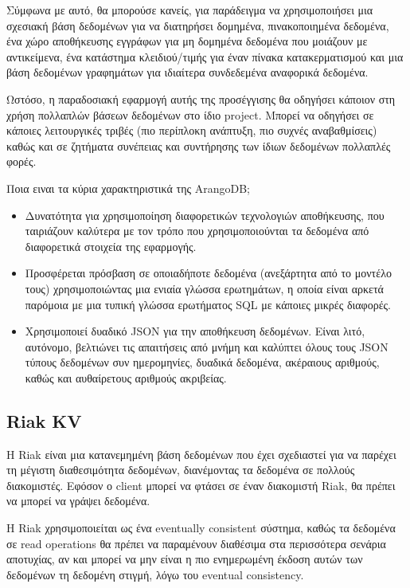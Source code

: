 \documentclass[conference]{IEEEtran}
\begin{document}
Σύμφωνα με αυτό, θα μπορούσε κανείς, για παράδειγμα να χρησιμοποιήσει μια σχεσιακή βάση δεδομένων για να διατηρήσει δομημένα, πινακοποιημένα δεδομένα, ένα χώρο αποθήκευσης εγγράφων για μη δομημένα δεδομένα που μοιάζουν με αντικείμενα, ένα κατάστημα κλειδιού/τιμής για έναν πίνακα κατακερματισμού και μια βάση δεδομένων γραφημάτων για ιδιαίτερα συνδεδεμένα αναφορικά δεδομένα.

Ωστόσο, η παραδοσιακή εφαρμογή αυτής της προσέγγισης θα οδηγήσει κάποιον στη χρήση πολλαπλών βάσεων δεδομένων στο ίδιο project. Μπορεί να οδηγήσει σε κάποιες λειτουργικές τριβές (πιο περίπλοκη ανάπτυξη, πιο συχνές αναβαθμίσεις) καθώς και σε ζητήματα συνέπειας και συντήρησης των ίδιων δεδομένων πολλαπλές φορές.

Ποια ειναι τα κύρια χαρακτηριστικά της ArangoDB;
\begin{itemize}
    \item 
    Δυνατότητα για χρησιμοποίηση διαφορετικών τεχνολογιών αποθήκευσης, που ταιριάζουν καλύτερα με τον τρόπο που χρησιμοποιούνται τα δεδομένα από διαφορετικά στοιχεία της εφαρμογής.
    
    \item 
    Προσφέρεται πρόσβαση σε οποιαδήποτε δεδομένα (ανεξάρτητα από το μοντέλο τους) χρησιμοποιώντας μια ενιαία γλώσσα ερωτημάτων, η οποία είναι αρκετά παρόμοια με μια τυπική γλώσσα ερωτήματος SQL με κάποιες μικρές διαφορές.

    \item 
    Χρησιμοποιεί δυαδικό JSON για την αποθήκευση δεδομένων. Είναι λιτό, αυτόνομο, βελτιώνει τις απαιτήσεις από μνήμη και καλύπτει όλους τους JSON τύπους δεδομένων συν ημερομηνίες, δυαδικά δεδομένα, ακέραιους αριθμούς, καθώς και αυθαίρετους αριθμούς ακριβείας.
\end{itemize}

\subsection{Riak KV}

 Η Riak είναι μια κατανεμημένη βάση δεδομένων που έχει σχεδιαστεί για να παρέχει τη μέγιστη διαθεσιμότητα δεδομένων, διανέμοντας τα δεδομένα σε πολλούς διακομιστές. Εφόσον ο client μπορεί να φτάσει σε έναν διακομιστή Riak, θα πρέπει να μπορεί να γράψει δεδομένα.

H Riak χρησιμοποιείται ως ένα eventually consistent σύστημα, καθώς τα δεδομένα σε read operations θα πρέπει να παραμένουν διαθέσιμα στα περισσότερα σενάρια αποτυχίας, αν και μπορεί να μην είναι η πιο ενημερωμένη έκδοση αυτών των δεδομένων τη δεδομένη στιγμή, λόγω του eventual consistency.
\end{document}
